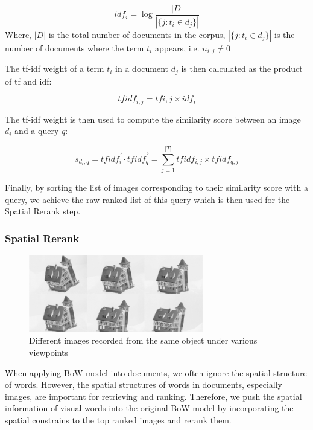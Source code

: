 \begin{equation}
        idf_{i} = \log{\frac{\left|D\right|}{\left|\{j: t_{i} \in d_{j}\}\right|}}
\end{equation}
Where, $\left|D\right|$ is the total number of documents in the corpus, $\left|\{j: t_{i} \in d_{j}\}\right|$ is the number of documents where the term $t_{i}$ appears, i.e. $n_{i, j} \ne 0$

The tf-idf weight of a term $t_{i}$ in a document $d_{j}$ is then calculated as the product of tf and idf:

\begin{equation}
{tfidf}_{i, j} = tf{i, j} \times idf_{i}
\end{equation}

The tf-idf weight is then used to compute the similarity score between an image $d_{i}$ and a query $q$:

\begin{equation}
s_{d_{i}, q} = \vec{{tfidf}_{i}} \cdot \vec{{tfidf}_{q}} = \sum\limits_{j = 1}^{\left|T\right|} {tfidf}_{i, j} \times {tfidf}_{q, j}
\end{equation} 

Finally, by sorting the list of images corresponding to their similarity score with a query, we achieve the raw ranked list of this query which is then used for the Spatial Rerank step.

\subsubsection{Spatial Rerank} \label{section:spatial_rerank}

\begin{figure}
    \centering
    \includegraphics[width=3.0in]{houses.png}
    \caption{Different images recorded from the same object under various viewpoints}
    \label{fig:image_houses}
\end{figure}

When applying BoW model into documents, we often ignore the spatial structure of words. However, the spatial structures of words in documents, especially images, are important for retrieving and ranking. Therefore, we push the spatial information of visual words into the original BoW model by incorporating the spatial constrains to the top ranked images and rerank them. 


